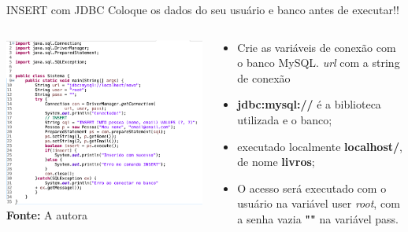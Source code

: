\documentclass[11pt,aspectratio=43,ignorenonframetext,t]{beamer}
\begin{document}
\begin{frame}{INSERT com JDBC}
Coloque os dados do seu usuário e banco antes de executar!! 
\begin{columns}
    \begin{column}{0.4\textwidth}
        \includegraphics[height=0.5\paperheight]{fig/aula22/main_insert_jdbc.png} \\
        \tiny{\textbf{Fonte: }A autora}
    \end{column}
    
    \begin{column}{0.5\textwidth}
    \begin{itemize}
    \item Crie as variáveis de conexão com o banco MySQL. \textit{url} com a string de conexão
     \item \textbf{jdbc:mysql://} é a biblioteca utilizada e o banco;
     \item executado localmente \textbf{localhost/}, de nome \textbf{livros}; 
     \item O acesso será executado com o usuário na variável user \textit{root}, com a senha vazia \textbf{""} na variável pass.
     \end{itemize}
 
    \end{column}
\end{columns}
\end{frame}
\end{document}
